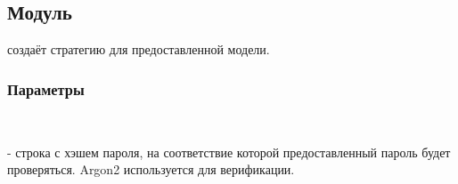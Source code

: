 \subsection{Модуль }\label{page-FPauth-strategies-module-FPauth+u+strategies-module-Password-module-Make}%
 создаёт стратегию для предоставленной модели.

\subsubsection{Параметры\label{parameters}}%
\label{page-FPauth-strategies-module-FPauth+u+strategies-module-Password-module-Make-argument-1-M}\begin{ocamlindent}\label{page-FPauth-strategies-module-FPauth+u+strategies-module-Password-module-Make-argument-1-M-type-t}\\
\label{page-FPauth-strategies-module-FPauth+u+strategies-module-Password-module-Make-argument-1-M-val-encrypted+u+password}\begin{ocamlindent} - строка с хэшем пароля, на соответствие которой предоставленный пароль будет проверяться. Argon2 используется для верификации.\end{ocamlindent}%
\medbreak
\end{ocamlindent}%
\\
